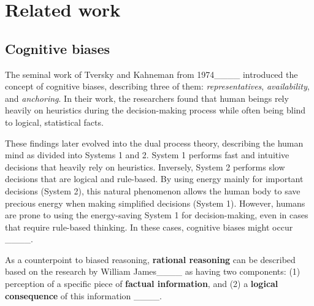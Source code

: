 \section{Related work}
\label{sec:related_work}
    
    \subsection{Cognitive biases}
    The seminal work of Tversky and Kahneman from 1974____ introduced the concept of cognitive biases, describing three of them: \textit{representatives}, \textit{availability}, and \textit{anchoring}. In their work, the researchers found that human beings rely heavily on heuristics during the decision-making process while often being blind to logical, statistical facts.  

    These findings later evolved into the dual process theory, describing the human mind as divided into Systems 1 and 2. System 1 performs fast and intuitive decisions that heavily rely on heuristics. Inversely, System 2 performs slow decisions that are logical and rule-based. By using energy mainly for important decisions (System 2), this natural phenomenon allows the human body to save precious energy when making simplified decisions (System 1).
    However, humans are prone to using the energy-saving System 1 for decision-making, even in cases that require rule-based thinking. In these cases, cognitive biases might occur ____. 

    As a counterpoint to biased reasoning, \textbf{rational reasoning} can be described based on the research by William James____ as having two components: (1) perception of a specific piece of \textbf{factual information}, and (2) a \textbf{logical consequence} of this information ____. 

    \noindent
    
    

